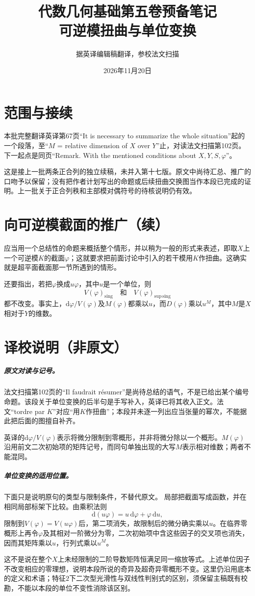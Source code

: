 \documentclass[openany,fontset=fandol]{ctexbook}
\begin{document}
\title{代数几何基础第五卷预备笔记\\可逆模扭曲与单位变换}
\author{据英译编辑稿翻译，参校法文扫描}
\date{2026年11月20日}
\maketitle
\chapter*{范围与接续}
本批完整翻译英译第67页“It is necessary to summarize the whole situation”起的一个段落，至“$M$ = relative dimension of $X$ over $Y$”止，对读法文扫描第102页。下一起点是同页“Remark. With the mentioned conditions about $X,Y,S,\varphi$”。

这是接上一批两条正合列的独立续稿，未并入第十七版。原文中尚待汇总、推广的口吻予以保留；没有把作者计划写出的命题或后续扭曲交换图当作本段已完成的证明。上一批关于正合列秩和主部模对偶符号的待核说明仍有效。
\chapter*{向可逆模截面的推广（续）}
应当用一个总结性的命题来概括整个情形，并以稍为一般的形式来表述，即取$X$上一个可逆模$K$的截面$\varphi$；这就要求把前面讨论中引入的若干模用$K$作扭曲。这确实就是超平面截面那一节所遇到的情形。

还要指出，若把$\varphi$换成$u\varphi$，其中$u$是一个单位，则
\[
V(\varphi)_{\mathrm{sing}}
\quad\text{和}\quad
V(\varphi)_{\mathrm{sup\,sing}}
\]
都不改变。事实上，$\mathrm d\varphi/V(\varphi)$及$M(\varphi)$都乘以$u$，而$D(\varphi)$乘以$u^M$，其中$M$是$X$相对于$Y$的维数。
\chapter*{译校说明（非原文）}
\paragraph{原文对读与记号。}
法文扫描第102页的“Il faudrait résumer”是尚待总结的语气，不是已给出某个编号命题。该段关于单位变换的后半句是手写补入，英译已将其收入正文。法文“tordre par $K$”对应“用$K$作扭曲”；本段并未逐一列出应当张量的幂次，不能据此把后面的图擅自补齐。

英译的$\mathrm d\varphi/V(\varphi)$表示将微分限制到零概形，并非将微分除以一个概形。$M(\varphi)$沿用前文二次初始项的矩阵记号，而同句单独出现的大写$M$表示相对维数；两者不能混同。
\paragraph{单位变换的适用位置。}
下面只是说明原句的类型与限制条件，不替代原文。
局部把截面写成函数，并在相同局部标架下比较。由乘积法则
\[
\mathrm d(u\varphi)=u\,\mathrm d\varphi+\varphi\,\mathrm du,
\]
限制到$V(\varphi)=V(u\varphi)$后，第二项消失，故限制后的微分确实乘以$u$。在临界零概形上再令$\varphi$及其相对一阶微分为零，二次初始项中含这些因子的交叉项也消失，因而其矩阵乘以$u$，行列式乘以$u^M$。

这不是说在整个$X$上未经限制的二阶导数矩阵恒满足同一缩放等式。上述单位因子不改变相应的零理想，说明本段所说的奇异及超奇异零概形不变。这里仍沿用底本的定义和术语；特征$2$下二次型光滑性与双线性判别式的区别，须保留主稿既有校勘，不能以本段的单位不变性消除该区别。
\end{document}
